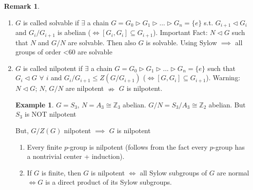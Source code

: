\documentclass[11pt]{article}
\theoremstyle{definition}
\newtheorem{example}[thm]{Example}
\newtheorem{rem}[thm]{Remark}
\numberwithin{equation}{section}
\newcommand{\Z}{\mathbb{Z}}
\begin{document}
\begin{rem}
\begin{enumerate}
    \item $G$ is called solvable if $\exists$ a chain $G = G_0 \vartriangleright G_1 \vartriangleright...\vartriangleright G_n = \{e\}$ s.t. $G_{i+1} \vartriangleleft G_i$ and $G_i / G_{i+1}$ is abelian ($\Leftrightarrow [G_i, G_i] \subseteq G_{i+1}$). Important Fact: $N \vartriangleleft G$ such that $N$ and $G/N$ are solvable. Then also $G$ is solvable. Using Sylow $\implies$ all groups of order <60 are solvable
    \item $G$ is called nilpotent if $\exists$ a chain $G = G_0 \vartriangleright G_1 \vartriangleright...\vartriangleright G_n = \{e\}$ such that $G_i \vartriangleleft G$ $\forall$ $i$ and $G_i / G_{i+1} \leq Z(G / G_{i+1})$ ($\Leftrightarrow [G,G_{i}] \subseteq G_{i+1}$). Warning: $N \vartriangleleft G$; $N$, $G/N$ are nilpotent $\nRightarrow$ $G$ is nilpotent.
    \begin{example}
    $G = S_3$, $N = A_3 \cong \Z_3$ abelian. $G/N = S_3 / A_3 \cong \Z_2$ abelian. But $S_3$ is NOT nilpotent
    \end{example}
    But, $G/Z(G)$ nilpotent $\implies$ $G$ is nilpotent
    \begin{enumerate}
        \item Every finite $p$-group is nilpotent (follows from the fact every $p$-group has a nontrivial center + induction).
        \item If $G$ is finite, then $G$ is nilpotent $\Leftrightarrow$ all Sylow subgroups of $G$ are normal $\Leftrightarrow G$ is a direct product of its Sylow subgroups.
    \end{enumerate}
\end{enumerate}
\end{rem}
\end{document}
